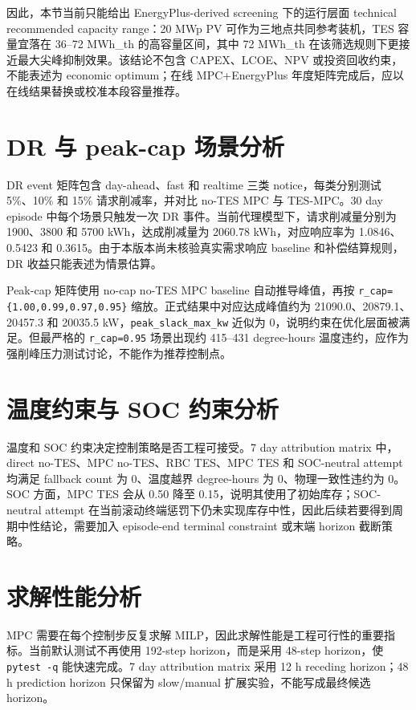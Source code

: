 \documentclass[UTF8,a4paper,12pt]{ctexrep}
\begin{document}
因此，本节当前只能给出 EnergyPlus-derived screening 下的运行层面 technical recommended capacity range：20 MWp PV 可作为三地点共同参考装机，TES 容量宜落在 36--72 MWh\_th 的高容量区间，其中 72 MWh\_th 在该筛选规则下更接近最大尖峰抑制效果。该结论不包含 CAPEX、LCOE、NPV 或投资回收约束，不能表述为 economic optimum；在线 MPC+EnergyPlus 年度矩阵完成后，应以在线结果替换或校准本段容量推荐。

\section{DR 与 peak-cap 场景分析}

DR event 矩阵包含 day-ahead、fast 和 realtime 三类 notice，每类分别测试 5\%、10\% 和 15\% 请求削减率，并对比 no-TES MPC 与 TES-MPC。30 day episode 中每个场景只触发一次 DR 事件。当前代理模型下，请求削减量分别为 1900、3800 和 5700 kWh，达成削减量为 2060.78 kWh，对应响应率为 1.0846、0.5423 和 0.3615。由于本版本尚未核验真实需求响应 baseline 和补偿结算规则，DR 收益只能表述为情景估算。

Peak-cap 矩阵使用 no-cap no-TES MPC baseline 自动推导峰值，再按 \texttt{r\_cap=\{1.00,0.99,0.97,0.95\}} 缩放。正式结果中对应达成峰值约为 21090.0、20879.1、20457.3 和 20035.5 kW，\texttt{peak\_slack\_max\_kw} 近似为 0，说明约束在优化层面被满足。但最严格的 \texttt{r\_cap=0.95} 场景出现约 415--431 degree-hours 温度违约，应作为强削峰压力测试讨论，不能作为推荐控制点。

\section{温度约束与 SOC 约束分析}

温度和 SOC 约束决定控制策略是否工程可接受。7 day attribution matrix 中，direct no-TES、MPC no-TES、RBC TES、MPC TES 和 SOC-neutral attempt 均满足 fallback count 为 0、温度越界 degree-hours 为 0、物理一致性违约为 0。SOC 方面，MPC TES 会从 0.50 降至 0.15，说明其使用了初始库存；SOC-neutral attempt 在当前滚动终端惩罚下仍未实现库存中性，因此后续若要得到周期中性结论，需要加入 episode-end terminal constraint 或末端 horizon 截断策略。

\section{求解性能分析}

MPC 需要在每个控制步反复求解 MILP，因此求解性能是工程可行性的重要指标。当前默认测试不再使用 192-step horizon，而是采用 48-step horizon，使 \texttt{pytest -q} 能快速完成。7 day attribution matrix 采用 12 h receding horizon；48 h prediction horizon 只保留为 slow/manual 扩展实验，不能写成最终候选 horizon。
\end{document}
